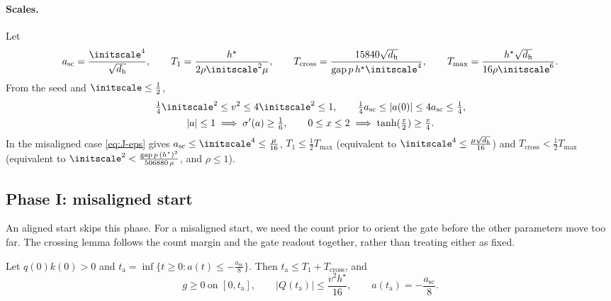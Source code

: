 \paragraph{Scales.} Let
\[
 a_{\mathrm{sc}}=\frac{\initscale^4}{\sqrt{d_{\mathrm h}}},\qquad T_1=\frac{h^\star}{2\rho\initscale^2\mu},\qquad
 T_{\mathrm{cross}}=\frac{15840\sqrt{d_{\mathrm h}}}{\mathrm{gap}\,p\,h^\star\initscale^4},\qquad T_{\max}=\frac{h^\star\sqrt{d_{\mathrm h}}}{16\rho\initscale^6}.
\]
From the seed and $\initscale\le\frac{1}{2}$,
\begin{equation}
 \begin{gathered}
 \tfrac{1}{4}\initscale^2\le v^2\le4\initscale^2\le1,\qquad \tfrac{1}{4}a_{\mathrm{sc}}\le|a(0)|\le4a_{\mathrm{sc}}\le\tfrac{1}{4},\\
 |a|\le1\implies\sigma'(a)\ge\tfrac{1}{6},\qquad 0\le x\le2\implies\tanh(\tfrac{x}{2})\ge\tfrac{x}{4} .
 \end{gathered}
 \label{eq:J-scales}
\end{equation}
In the misaligned case \cref{eq:J-eps} gives $a_{\mathrm{sc}}\le\initscale^4\le\frac{\mu}{16}$, $T_1\le\frac{1}{2}T_{\max}$ (equivalent to $\initscale^4\le\frac{\mu\sqrt{d_{\mathrm h}}}{16}$) and
$T_{\mathrm{cross}}<\frac{1}{2}T_{\max}$ (equivalent to $\initscale^2<\frac{\mathrm{gap}\,p\,(h^\star)^2}{506880\,\rho}$, and $\rho\le1$).

\subsection{Phase I: misaligned start}

An aligned start skips this phase. For a misaligned start, we need the count prior to orient the gate before the other parameters
move too far. The crossing lemma follows the count margin and the gate readout together, rather than treating either as fixed.

\begin{lemma}[Crossing]
\label{lem:J-cross}
Let $q(0)k(0)>0$ and $t_{\mathrm a}=\inf\{t\ge0:a(t)\le-\frac{a_{\mathrm{sc}}}{8}\}$. Then $t_{\mathrm a}\le T_1+T_{\mathrm{cross}}$, and
\[
 g\ge0\ \text{on }[0,t_{\mathrm a}],\qquad |Q(t_{\mathrm a})|\le\frac{v^2h^\star}{16},\qquad a(t_{\mathrm a})=-\frac{a_{\mathrm{sc}}}{8}.
\]
\end{lemma}

